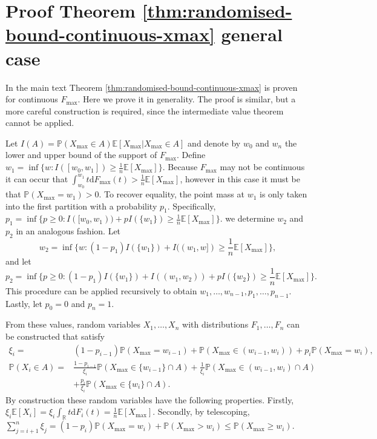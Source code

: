 \documentclass[11pt,a4paper]{article}
\numberwithin{equation}{section}
\begin{document}
\newpage
\section{Proof Theorem \ref{thm:randomised-bound-continuous-xmax} general case}\label{proof:universal-upperbound-general}
In the main text Theorem \ref{thm:randomised-bound-continuous-xmax} is proven for continuous $F_{\max}$. Here we prove it in generality. The proof is similar, but a more careful construction is required, since the intermediate value theorem cannot be applied. 

Let $I(A)=\mathbb{P}(X_{\max}\in A)\mathbb{E}[X_{\max}|X_{\max}\in A]$ and denote by $w_0$ and $w_n$ the lower and upper bound of the support of $F_{\max}$. Define $w_1=\inf\{w:I([w_0,w_1])\ge\frac{1}{n}\mathbb{E}[X_{\max}]\}$. Because $F_{\max}$ may not be continuous it can occur that $\int_{w_0}^{w_1}t\mathrm{d}F_{\max}(t)> \frac{1}{n}\mathbb{E}[X_{\max}]$, however in this case it must be that $\mathbb{P}(X_{\max}=w_1)>0$. 
To recover equality, the point mass at $w_1$ is only taken into the first partition with a probability $p_1$. Specifically, $p_1=\inf\{p\ge 0:I([w_0,w_1))+pI(\{w_1\})\ge\frac{1}{n}\mathbb{E}[X_{\max}]\}$. 
we determine $w_2$ and $p_2$ in an analogous fashion.
Let $$w_2=\inf\{w: (1-p_1)I(\{w_1\})+I((w_1,w])\ge\frac{1}{n}\mathbb{E}[X_{\max}]\},$$ and let $$p_2=\inf\{p\ge 0:(1-p_1)I(\{w_1\})+I((w_1,w_2))+pI(\{w_2\})\ge\frac{1}{n}\mathbb{E}[X_{\max}]\}.$$
This procedure can be applied recursively to obtain $w_1,\dots,w_{n-1},p_1,\dots,p_{n-1}$. Lastly, let $p_0=0$ and $p_n=1$.

From these values, random variables $X_1,\dots,X_n$ with distributions $F_1,\dots,F_n$ can be constructed that satisfy
\begin{align*}
    \xi_i=&(1-p_{i-1})\mathbb{P}(X_{\max}=w_{i-1})+\mathbb{P}(X_{\max}\in(w_{i-1},w_i))+p_{i}\mathbb{P}(X_{\max}=w_{i}),\\
    \mathbb{P}(X_i\in A)=&\frac{1-p_{i-1}}{\xi_i}\mathbb{P}(X_{\max}\in \{w_{i-1}\} \cap A)+\frac{1}{\xi_i}\mathbb{P}(X_{\max}\in(w_{i-1},w_i)\cap A)\\&+\frac{p_{i}}{\xi_i}\mathbb{P}(X_{\max}\in\{w_{i}\}\cap A).
\end{align*}
By construction these random variables have the following properties. Firstly, $\xi_i\mathbb{E}[X_i]=\xi_i \int_{\mathbb{R}}t\mathrm{d}F_i(t)=\frac{1}{n}\mathbb{E}[X_{\max}]$. 
Secondly, by telescoping, $\sum_{j=i+1}^n\xi_j=(1-p_{i})\mathbb{P}(X_{\max}=w_i)+\mathbb{P}(X_{\max}>w_i)\le \mathbb{P}(X_{\max}\ge w_i)$. 
\end{document}
